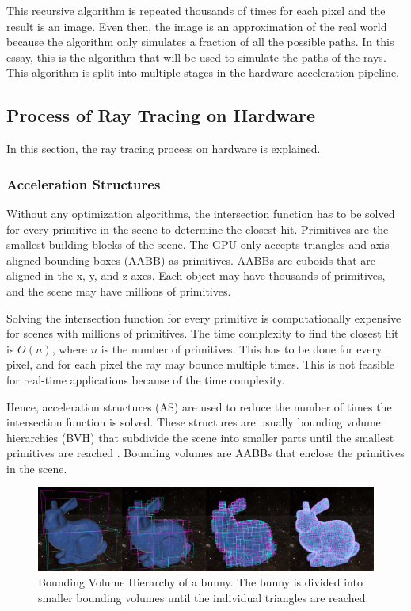 \documentclass[12pt]{article}
\begin{document}
This recursive algorithm is repeated thousands of times for each pixel and the result is an image.
Even then, the image is an approximation of the real world because the algorithm only simulates a fraction of all the possible paths.
In this essay, this is the algorithm that will be used to simulate the paths of the rays.
This algorithm is split into multiple stages in the hardware acceleration pipeline.

\subsection{Process of Ray Tracing on Hardware}
In this section, the ray tracing process on hardware is explained.

\subsubsection{Acceleration Structures}

Without any optimization algorithms, the intersection function has to be solved for every primitive in the scene to determine the closest hit.
Primitives are the smallest building blocks of the scene. The GPU only accepts triangles and axis aligned bounding boxes (AABB) as primitives.
AABBs are cuboids that are aligned in the x, y, and z axes.
Each object may have thousands of primitives, and the scene may have millions of primitives.


Solving the intersection function for every primitive is computationally expensive for scenes with millions of primitives.
The time complexity to find the closest hit is $O(n)$, where $n$ is the number of primitives.
This has to be done for every pixel, and for each pixel the ray may bounce multiple times.
This is not feasible for real-time applications because of the time complexity.


Hence, acceleration structures (AS) are used to reduce the number of times the intersection function is solved.
These structures are usually bounding volume hierarchies (BVH) that subdivide the scene into smaller parts until the smallest primitives are reached \parencite{NVIDIA:Raytracing}.
Bounding volumes are AABBs that enclose the primitives in the scene.

\begin{figure}[H]
    \includegraphics[scale=0.22]{BVH-Visualization}
    \caption{
        Bounding Volume Hierarchy of a bunny.
        The bunny is divided into smaller bounding volumes until the individual triangles are reached.
        \parencite{Medium:BVH-Visualization}
    }
    \label{fig:BVH-Visualization}
\end{figure}
\end{document}
